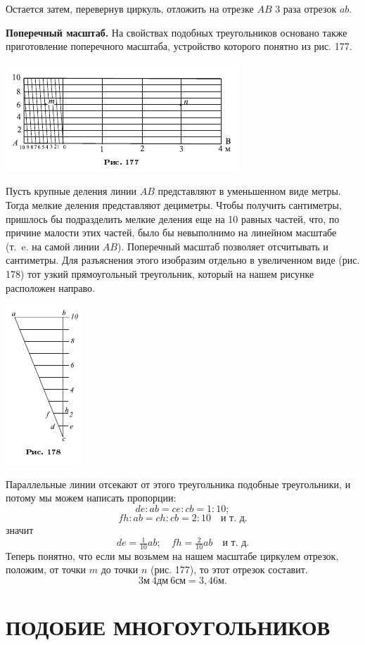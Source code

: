 \documentclass[oneside]{book}
\begin{document}
Остается затем, перевернув циркуль, отложить на отрезке $AB$ 3 раза отрезок $ab$.

\textbf{Поперечный масштаб.}
На свойствах подобных треугольников основано также приготовление поперечного масштаба, устройство которого понятно из рис. 177.

\includegraphics{pics/ris-177}

Пусть крупные деления линии $AB$ представляют в уменьшенном виде метры.
Тогда мелкие деления представляют дециметры.
Чтобы получить сантиметры, пришлось бы подразделить мелкие деления еще на 10 равных частей, что, по причине малости этих частей, было бы невыполнимо на линейном масштабе (т.~e.
на самой линии $AB$).
Поперечный масштаб позволяет отсчитывать и сантиметры.
Для разъяснения этого изобразим отдельно в увеличенном виде (рис. 178) тот узкий прямоугольный треугольник, который на нашем рисунке расположен направо.

\includegraphics{pics/ris-178}

Параллельные линии отсекают от этого треугольника подобные треугольники, и потому мы можем написать пропорции:
\[de:ab=ce:cb=1:10;\]
\[fh:ab=ch:cb=2:10\quad\text{и т.~д.}\]
значит
\[de=\tfrac1{10}ab;\quad fh=\tfrac2{10}ab\quad\text{и т.~д.}\]
Теперь понятно, что если мы возьмем на нашем масштабе циркулем отрезок, положим, от точки $m$ до точки $n$ (рис. 177), то этот отрезок составит.
\[3 \text{м}\  4 \text{дм}\  6 \text{см} = 3{,}46\text{м}.\]

\section{ПОДОБИЕ МНОГОУГОЛЬНИКОВ}
\end{document}
